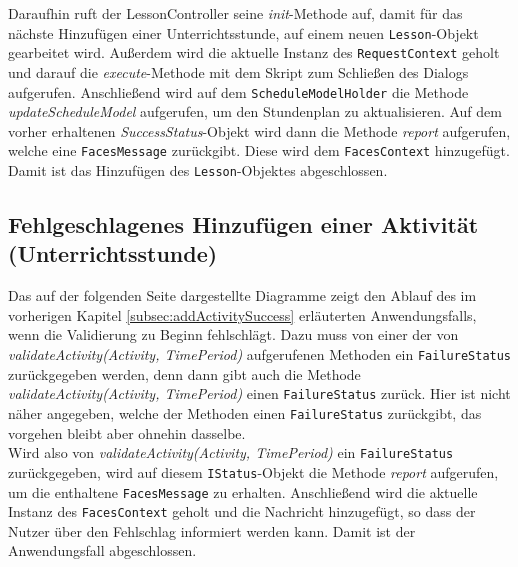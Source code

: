 \documentclass[fontsize=12pt,paper=a4,twoside]{scrartcl}
\begin{document}
Daraufhin ruft der LessonController seine \textit{init}-Methode auf, damit für das nächste Hinzufügen einer Unterrichtsstunde, auf einem neuen \texttt{Lesson}-Objekt gearbeitet wird. Außerdem wird die aktuelle Instanz des \texttt{RequestContext} geholt und darauf die \textit{execute}-Methode mit dem Skript zum Schließen des Dialogs aufgerufen.
Anschließend wird auf dem \texttt{ScheduleModelHolder} die Methode \textit{updateScheduleModel} aufgerufen, um den Stundenplan zu aktualisieren. Auf dem vorher erhaltenen \textit{SuccessStatus}-Objekt wird dann die Methode \textit{report} aufgerufen, welche eine \texttt{FacesMessage} zurückgibt. Diese wird dem \texttt{FacesContext} hinzugefügt. \\
Damit ist das Hinzufügen des \texttt{Lesson}-Objektes abgeschlossen.









\subsection{Fehlgeschlagenes Hinzufügen einer Aktivität (Unterrichtsstunde)}
Das auf der folgenden Seite dargestellte Diagramme zeigt den Ablauf des im vorherigen Kapitel \ref{subsec:addActivitySuccess} erläuterten Anwendungsfalls, wenn die Validierung zu Beginn fehlschlägt. Dazu muss von einer der von \textit{validateActivity(Activity, TimePeriod)} aufgerufenen Methoden ein \texttt{FailureStatus} zurückgegeben werden, denn dann gibt auch die Methode \textit{validateActivity(Activity, TimePeriod)} einen \texttt{FailureStatus} zurück. Hier ist nicht näher angegeben, welche der Methoden einen \texttt{FailureStatus} zurückgibt, das vorgehen bleibt aber ohnehin dasselbe. \\
Wird also von \textit{validateActivity(Activity, TimePeriod)} ein \texttt{FailureStatus} zurückgegeben, wird auf diesem \texttt{IStatus}-Objekt die Methode \textit{report} aufgerufen, um die enthaltene \texttt{FacesMessage} zu erhalten. Anschließend wird die aktuelle Instanz des \texttt{FacesContext} geholt und die Nachricht hinzugefügt, so dass der Nutzer über den Fehlschlag informiert werden kann. Damit ist der Anwendungsfall abgeschlossen.



\end{document}
